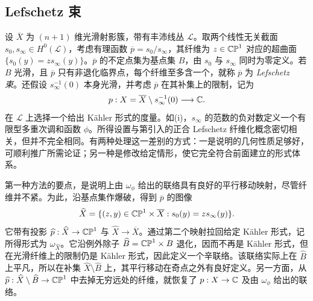 \subsection{Lefschetz 束}\label{sec:19b}
设 $\overline X$ 为 $(n+1)$ 维光滑射影簇，带有丰沛线丛 $\mathcal L$。取两个线性无关截面 $s_0,s_\infty\in H^0(\mathcal L)$，考虑有理函数 $\overline p=s_0/s_\infty$，其纤维为 $z\in\mathbb{CP}^1$ 对应的超曲面 $\{s_0(y)=zs_\infty(y)\}$。$\overline p$ 的不定点集为基点集 $B$，由 $s_0$ 与 $s_\infty$ 同时为零定义。若 $B$ 光滑，且 $\overline p$ 只有非退化临界点，每个纤维至多含一个，就称 $\overline p$ 为 \emph{Lefschetz 束}。还假设 $s_\infty^{-1}(0)$ 本身光滑，并考虑 $\overline p$ 在其补集上的限制，记为
\begin{equation}\label{eq:19.1}
p:X=\overline X\setminus s_\infty^{-1}(0)\longrightarrow\mathbb C.
\end{equation}
在 $\mathcal L$ 上选择一个给出 Kähler 形式的度量。如(i)，$s_\infty$ 的范数的负对数定义一个有限型多重次调和函数 $\phi$。所得设置与第引入的正合 Lefschetz 纤维化概念密切相关，但并不完全相同。有两种处理这一差别的方式：一是说明的几何性质足够好，可顺利推广所需论证；另一种是修改给定情形，使它完全符合前面建立的形式体系。

第一种方法的要点，是说明上由 $\omega_\phi$ 给出的联络具有良好的平行移动映射，尽管纤维并不紧。为此，沿基点集作爆破，得到 $\overline p$ 的图像
\[
\widehat X=\{(z,y)\in\mathbb{CP}^1\times\overline X:s_0(y)=zs_\infty(y)\}.
\]
它带有投影 $\widehat p:\widehat X\to\mathbb{CP}^1$ 与 $\widehat X\to\overline X$。通过第二个映射拉回给定 Kähler 形式，记所得形式为 $\omega_{\widehat X}$。它沿例外除子 $\widehat B=\mathbb{CP}^1\times B$ 退化，因而不再是 Kähler 形式，但在光滑纤维上的限制仍是 Kähler 形式，因此定义一个辛联络。该联络实际上在 $\widehat B$ 上平凡，所以在补集 $\widehat X\setminus\widehat B$ 上，其平行移动在奇点之外有良好定义。另一方面，从 $\widehat p:\widehat X\setminus\widehat B\to\mathbb{CP}^1$ 中去掉无穷远处的纤维，就恢复了 $p:X\to\mathbb C$ 及由 $\omega_\phi$ 给出的联络。

